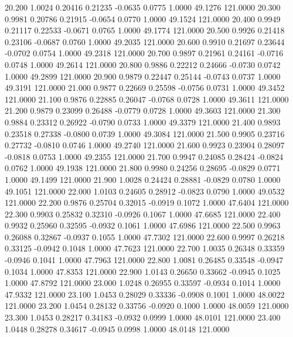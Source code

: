   20.200   1.0024   0.20416   0.21235  -0.0635   0.0775   1.0000  49.1276 121.0000
  20.300   0.9981   0.20786   0.21915  -0.0654   0.0770   1.0000  49.1524 121.0000
  20.400   0.9949   0.21117   0.22533  -0.0671   0.0765   1.0000  49.1774 121.0000
  20.500   0.9926   0.21418   0.23106  -0.0687   0.0760   1.0000  49.2035 121.0000
  20.600   0.9910   0.21697   0.23644  -0.0702   0.0754   1.0000  49.2318 121.0000
  20.700   0.9897   0.21961   0.24161  -0.0716   0.0748   1.0000  49.2614 121.0000
  20.800   0.9886   0.22212   0.24666  -0.0730   0.0742   1.0000  49.2899 121.0000
  20.900   0.9879   0.22447   0.25144  -0.0743   0.0737   1.0000  49.3191 121.0000
  21.000   0.9877   0.22669   0.25598  -0.0756   0.0731   1.0000  49.3452 121.0000
  21.100   0.9876   0.22885   0.26047  -0.0768   0.0728   1.0000  49.3611 121.0000
  21.200   0.9879   0.23099   0.26488  -0.0779   0.0728   1.0000  49.3603 121.0000
  21.300   0.9884   0.23312   0.26922  -0.0790   0.0733   1.0000  49.3379 121.0000
  21.400   0.9893   0.23518   0.27338  -0.0800   0.0739   1.0000  49.3084 121.0000
  21.500   0.9905   0.23716   0.27732  -0.0810   0.0746   1.0000  49.2740 121.0000
  21.600   0.9923   0.23904   0.28097  -0.0818   0.0753   1.0000  49.2355 121.0000
  21.700   0.9947   0.24085   0.28424  -0.0824   0.0762   1.0000  49.1938 121.0000
  21.800   0.9980   0.24256   0.28695  -0.0829   0.0771   1.0000  49.1499 121.0000
  21.900   1.0028   0.24424   0.28881  -0.0829   0.0780   1.0000  49.1051 121.0000
  22.000   1.0103   0.24605   0.28912  -0.0823   0.0790   1.0000  49.0532 121.0000
  22.200   0.9876   0.25704   0.32015  -0.0919   0.1072   1.0000  47.6404 121.0000
  22.300   0.9903   0.25832   0.32310  -0.0926   0.1067   1.0000  47.6685 121.0000
  22.400   0.9932   0.25960   0.32595  -0.0932   0.1061   1.0000  47.6986 121.0000
  22.500   0.9963   0.26088   0.32867  -0.0937   0.1055   1.0000  47.7302 121.0000
  22.600   0.9997   0.26218   0.33125  -0.0942   0.1048   1.0000  47.7623 121.0000
  22.700   1.0035   0.26348   0.33359  -0.0946   0.1041   1.0000  47.7963 121.0000
  22.800   1.0081   0.26485   0.33548  -0.0947   0.1034   1.0000  47.8353 121.0000
  22.900   1.0143   0.26650   0.33662  -0.0945   0.1025   1.0000  47.8792 121.0000
  23.000   1.0248   0.26955   0.33597  -0.0934   0.1014   1.0000  47.9332 121.0000
  23.100   1.0453   0.28029   0.33336  -0.0908   0.1001   1.0000  48.0022 121.0000
  23.200   1.0454   0.28132   0.33756  -0.0920   0.1000   1.0000  48.0059 121.0000
  23.300   1.0453   0.28217   0.34183  -0.0932   0.0999   1.0000  48.0101 121.0000
  23.400   1.0448   0.28278   0.34617  -0.0945   0.0998   1.0000  48.0148 121.0000
